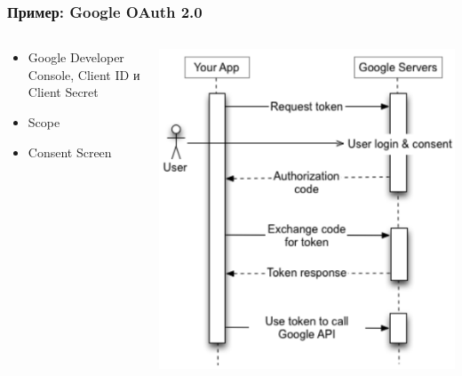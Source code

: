 \documentclass{../../slides-style}
\begin{document}
    \begin{frame}
        \frametitle{Пример: Google OAuth 2.0}
        \begin{columns}
            \begin{column}{0.5\textwidth}
                \begin{itemize}
                    \item Google Developer Console, Client ID и Client Secret
                    \item Scope
                    \item Consent Screen
                \end{itemize}
            \end{column}
            \begin{column}{0.4\textwidth}
                \begin{center}
                    \includegraphics[width=\textwidth]{googleOAuth.png}
                \end{center}
            \end{column}
        \end{columns}
    \end{frame}
\end{document}
